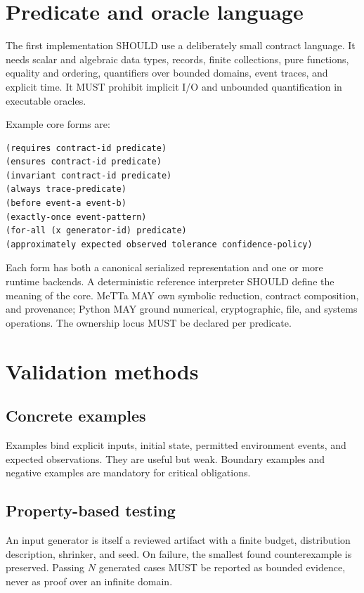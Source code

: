 \documentclass[10pt]{article}
\begin{document}
\section{Predicate and oracle language}

The first implementation SHOULD use a deliberately small contract language.
It needs scalar and algebraic data types, records, finite collections, pure
functions, equality and ordering, quantifiers over bounded domains, event
traces, and explicit time.  It MUST prohibit implicit I/O and unbounded
quantification in executable oracles.

Example core forms are:

\begin{lstlisting}
(requires contract-id predicate)
(ensures contract-id predicate)
(invariant contract-id predicate)
(always trace-predicate)
(before event-a event-b)
(exactly-once event-pattern)
(for-all (x generator-id) predicate)
(approximately expected observed tolerance confidence-policy)
\end{lstlisting}

Each form has both a canonical serialized representation and one or more
runtime backends.  A deterministic reference interpreter SHOULD define the
meaning of the core.  MeTTa MAY own symbolic reduction, contract composition,
and provenance; Python MAY ground numerical, cryptographic, file, and systems
operations.  The ownership locus MUST be declared per predicate.

\section{Validation methods}

\subsection{Concrete examples}

Examples bind explicit inputs, initial state, permitted environment events,
and expected observations.  They are useful but weak.  Boundary examples and
negative examples are mandatory for critical obligations.

\subsection{Property-based testing}

An input generator is itself a reviewed artifact with a finite budget,
distribution description, shrinker, and seed.  On failure, the smallest found
counterexample is preserved.  Passing $N$ generated cases MUST be reported as
bounded evidence, never as proof over an infinite domain.
\end{document}
